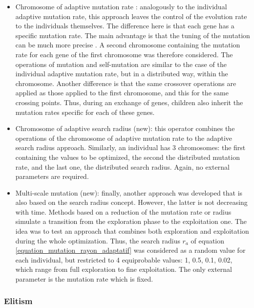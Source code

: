 \documentclass{ametsoc}
\begin{document}
\begin{itemize}
	\item Chromosome of adaptive mutation rate \citep[or \textit{n adaptative mutation rate},][]{Back1992a}: analogously to the individual adaptive mutation rate, this approach leaves the control of the evolution rate to the individuals themselves. The difference here is that each gene has a specific mutation rate. The main advantage is that the tuning of the mutation can be much more precise \citep{Smith1997a}. A second chromosome containing the mutation rate for each gene of the first chromosome was therefore considered. The operations of mutation and self-mutation are similar to the case of the individual adaptive mutation rate, but in a distributed way, within the chromosome. Another difference is that the same crossover operations are applied as those applied to the first chromosome, and this for the same crossing points. Thus, during an exchange of genes, children also inherit the mutation rates specific for each of these genes.
	
	\item Chromosome of adaptive search radius (new): this operator combines the operations of the chromosome of adaptive mutation rate to the adaptive search radius approach. Similarly, an individual has 3 chromosomes: the first containing the values to be optimized, the second the distributed mutation rate, and the last one, the distributed search radius. Again, no external parameters are required.
	
	\item Multi-scale mutation (new): finally, another approach was developed that is also based on the search radius concept. However, the latter is not decreasing with time. Methods based on a reduction of the mutation rate or radius simulate a transition from the exploration phase to the exploitation one. The idea was to test an approach that combines both exploration and exploitation during the whole optimization. Thus, the search radius $r_{a}$ of equation \ref{equation_mutation_rayon_adaptatif} was considered as a random value for each individual, but restricted to 4 equiprobable values: 1, 0.5, 0.1, 0.02, which range from full exploration to fine exploitation. The only external parameter is the mutation rate which is fixed.
	
\end{itemize}


\subsubsection{Elitism}
\end{document}
